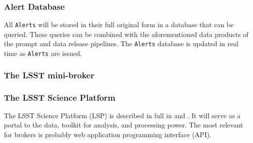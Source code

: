 \subsubsection{Alert Database}

All {\tt Alerts} will be stored in their full original form in a database that can be queried. These queries can be combined with the aforementioned data products of the prompt and data release pipelines. The {\tt Alerts} database is updated in real time as {\tt Alerts} are issued.

\subsubsection{The LSST mini-broker}\label{sssec:mini-broker}

\subsubsection{The LSST Science Platform}

The LSST Science Platform (LSP) is described in full in  and . It will serve as a portal to the data, toolkit for analysis, and processing power. The most relevant for brokers is probably web application programming interface (API). 

